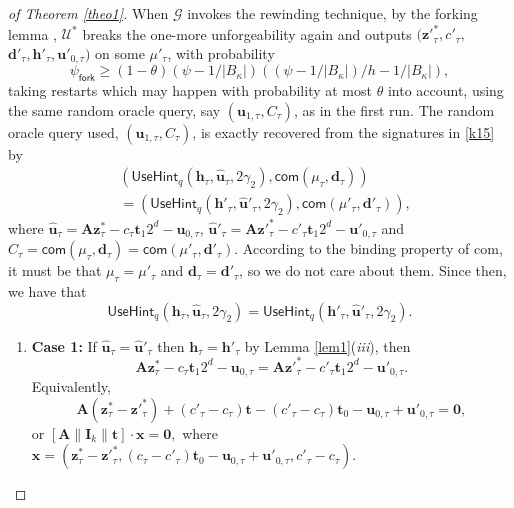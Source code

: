 \documentclass[conference]{IEEEtran}
\newtheorem{proof}{Proof}
\begin{document}
\begin{proof}[of Theorem \ref{theo1}]
		When $\mathcal{G}$ invokes the rewinding technique, by the forking lemma \cite[Lemma A.1]{Ruc08}, $\mathcal{U}^*$ breaks the one-more unforgeability again and outputs $ (\mathbf{z'}^*_{\tau}, c'_\tau,$ $ \mathbf{d}'_\tau, \mathbf{h}'_{\tau}, \mathbf{u}'_{0,\tau})$ on some $\mu'_\tau$,  with probability $$\psi_{\textsf{fork}} \geq (1-\theta) (\psi-1/|B_{\kappa}|)((\psi-1/|B_{\kappa}|)/h-1/|B_{\kappa}|),$$ taking  restarts which may happen with probability at most $\theta$ into account, using the same random oracle query, say $(\mathbf{u}_{1,\tau}, C_\tau)$, as in the first run. The random oracle query used, $(\mathbf{u}_{1,\tau}, C_\tau)$,   is exactly recovered from the signatures in \eqref{k15} by
		\begin{equation*}\label{key}
		\begin{split}
	&	(\textsf{UseHint}_q(\mathbf{h}_\tau,\widehat{\mathbf{u}}_\tau,2\gamma_2), \mathsf{com}(\mu_\tau,\mathbf{d}_\tau))\\&=(\textsf{UseHint}_q(\mathbf{h}'_\tau,\widehat{\mathbf{u}}'_\tau,2\gamma_2), \mathsf{com}(\mu'_\tau,\mathbf{d}'_\tau)),
		\end{split}
		\end{equation*}
		where $\widehat{\mathbf{u}}_\tau=\mathbf{A}\mathbf{z}^*_\tau-c_\tau\mathbf{t}_{1}2^d-\mathbf{u}_{0,\tau}$, $\widehat{\mathbf{u}}'_\tau=\mathbf{A}\mathbf{z}'^*_\tau-c'_\tau\mathbf{t}_{1}2^d-\mathbf{u}'_{0,\tau}$ and $C_\tau=\mathsf{com}(\mu_\tau,\mathbf{d}_\tau)=\mathsf{com}(\mu'_\tau,\mathbf{d}'_\tau)$. According to the binding property of \textsf{com}, it must be that $\mu_\tau=\mu'_\tau$ and $\mathbf{d}_\tau=\mathbf{d}'_\tau$, so we do not care about them.
		Since then, we have that
		$$\textsf{UseHint}_q(\mathbf{h}_\tau,\widehat{\mathbf{u}}_\tau,2\gamma_2)=\textsf{UseHint}_q(\mathbf{h}'_\tau,\widehat{\mathbf{u}}'_\tau,2\gamma_2).$$	
		\iffalse
		\begin{enumerate}
			\item \textbf{Case 1:}  If $\widehat{\mathbf{u}}_\tau=\widehat{\mathbf{u}}'_\tau$ then $\mathbf{h}_\tau=\mathbf{h}'_\tau$ by Lemma \ref{lem1}(\textit{iii}), then
			$$\mathbf{A}\mathbf{z}^*_\tau-c_\tau\mathbf{t}_{1}2^d-\mathbf{u}_{0,\tau}=\mathbf{A}\mathbf{z}'^*_\tau-c'_\tau\mathbf{t}_{1}2^d-\mathbf{u}'_{0,\tau}.$$
			Equivalently, 
			$$\mathbf{A}(\mathbf{z}^*_\tau-\mathbf{z}'^*_\tau)+(c'_\tau-c_\tau)\mathbf{t}-(c'_\tau-c_\tau)\mathbf{t}_{0}-\mathbf{u}_{0,\tau}+\mathbf{u}'_{0,\tau}=\textbf{0},$$ or
			$[\mathbf{A}\|\mathbf{I}_{k}\|\mathbf{t}]\cdot \mathbf{x}=\textbf{0},$
			where $\mathbf{x}=(\mathbf{z}^*_\tau-\mathbf{z}'^*_\tau,(c_\tau-c'_\tau)\mathbf{t}_{0}-\mathbf{u}_{0,\tau}+\mathbf{u}'_{0,\tau}, c'_\tau-c_\tau).$

\end{enumerate}
\end{proof}
\end{document}
